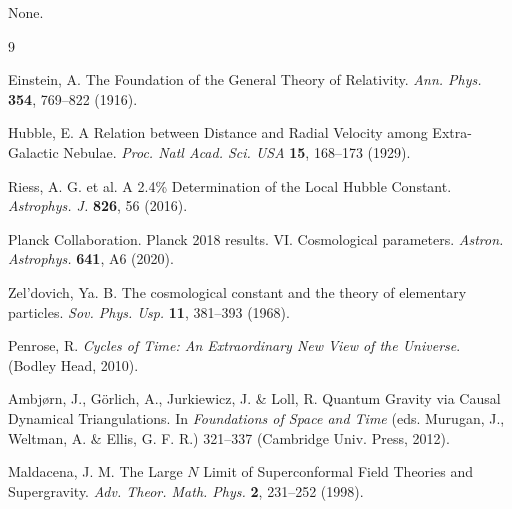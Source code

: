 \documentclass[12pt,a4paper]{article}
\begin{document}
None.

\begin{thebibliography}{9}

Einstein, A. The Foundation of the General Theory of Relativity. \textit{Ann. Phys.} \textbf{354}, 769--822 (1916).

Hubble, E. A Relation between Distance and Radial Velocity among Extra-Galactic Nebulae. \textit{Proc. Natl Acad. Sci. USA} \textbf{15}, 168--173 (1929).

Riess, A. G. et al. A 2.4\% Determination of the Local Hubble Constant. \textit{Astrophys. J.} \textbf{826}, 56 (2016).

Planck Collaboration. Planck 2018 results. VI. Cosmological parameters. \textit{Astron. Astrophys.} \textbf{641}, A6 (2020).

Zel'dovich, Ya. B. The cosmological constant and the theory of elementary particles. \textit{Sov. Phys. Usp.} \textbf{11}, 381--393 (1968).

Penrose, R. \textit{Cycles of Time: An Extraordinary New View of the Universe}. (Bodley Head, 2010).

Ambj{\o}rn, J., G{\"o}rlich, A., Jurkiewicz, J. \& Loll, R. Quantum Gravity via Causal Dynamical Triangulations. In \textit{Foundations of Space and Time} (eds. Murugan, J., Weltman, A. \& Ellis, G. F. R.) 321--337 (Cambridge Univ. Press, 2012).

Maldacena, J. M. The Large $N$ Limit of Superconformal Field Theories and Supergravity. \textit{Adv. Theor. Math. Phys.} \textbf{2}, 231--252 (1998).

\end{thebibliography}
\end{document}
